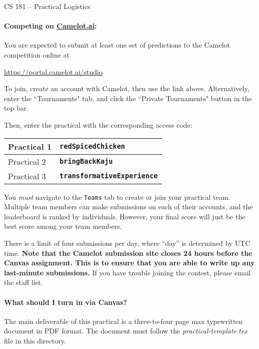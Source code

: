 \documentclass[12pt,letterpaper]{article}
\begin{document}
\begin{center}
  {\large CS 181 -- Practical Logistics}
\end{center}


\paragraph{Competing on \href{https://camelot.ai}{Camelot.ai}:} You are expected to submit at least one set of predictions to the Camelot competition online at
	\begin{center}
		\href{https://portal.camelot.ai/studio}{https://portal.camelot.ai/studio}
	\end{center}

	To join, create an account with Camelot, then use the link above. Alternatively, enter the ``Tournaments" tab, and click the ``Private Tournaments" button in the top bar. 

Then, enter the practical with the corresponding access code:

\begin{center}
\begin{tabular}{l|l}
Practical 1 & \textbf{\texttt{redSpicedChicken}}\\
\hline
Practical 2 & \textbf{\texttt{bringBackKaju}}\\
\hline
Practical 3 & \textbf{\texttt{transformativeExperience}}
\end{tabular}
\end{center}

You \emph{must} navigate to the \texttt{Teams} tab to create or join your practical team. Multiple team members can make submissions on each of their accounts, and the leaderboard is ranked by individuals. However, your final score will just be the best score among your team members. 

There is a limit of four submissions per day, where ``day'' is determined by UTC time.  \textbf{Note that the Camelot submission site closes 24 hours before the Canvas assignment.  This is to ensure that you are able to write up any last-minute submissions.} If you have trouble joining the contest, please email the staff list.



\paragraph{What should I turn in via Canvas?}

The main deliverable of this practical is a three-to-four page max
typewritten document in PDF format.  The document must follow the
\textit{practical-template.tex} file in this directory.
\end{document}
